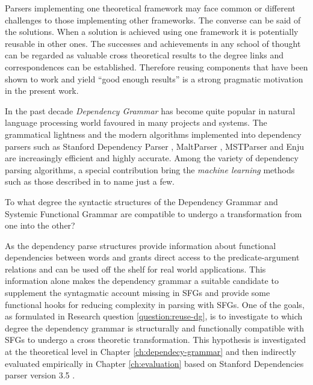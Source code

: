 Parsers implementing one theoretical framework may face common or different challenges to those implementing other frameworks. The converse can be said of the solutions. When a solution is achieved using one framework it is potentially reusable in other ones. The successes and achievements in any school of thought can be regarded as valuable cross theoretical results to the degree links and correspondences can be established. Therefore reusing components that have been shown to work and yield ``good enough results'' is a strong pragmatic motivation in the present work.


%
In the past decade \textit{Dependency Grammar} \citep{Tesniere2015} has become quite popular in natural language processing world favoured in many projects and systems. The grammatical lightness and the  modern algorithms implemented into dependency parsers such as Stanford Dependency Parser \citep{Marneffe2006}, MaltParser \citep{Nivre2006}, MSTParser \citep{McDonald2006} and Enju \citep{Miyao2005} are increasingly efficient and highly accurate. Among the variety of dependency parsing algorithms, a special contribution bring the \textit{machine learning} methods such as those described in \citet{mcdonald2005online, mcdonald2006online, carreras2007experiments, zhang2011transition, pei2015effective} to name just a few. 

\begin{question}\label{question:reuse-dg}
    To what degree the syntactic structures of the Dependency Grammar and Systemic Functional Grammar are compatible to undergo a transformation from one into the other?
\end{question}

As the dependency parse structures provide information about functional dependencies between words and grants direct access to the predicate-argument relations and can be used off the shelf for real world applications. 
This information alone makes the dependency grammar a suitable candidate to supplement the syntagmatic account missing in SFGs and provide some functional hooks for reducing complexity in parsing with SFGs. One of the goals, as formulated in Research question \ref{question:reuse-dg}, is to investigate to which degree the dependency grammar is structurally and functionally compatible with SFGs to undergo a cross theoretic transformation. This hypothesis is investigated at the theoretical level in Chapter \ref{ch:dependecy-grammar} and then indirectly evaluated empirically in Chapter \ref{ch:evaluation} based on Stanford Dependencies parser version 3.5 \citep{Marneffe2008a,Marneffe2008, Marneffe2014}. 

